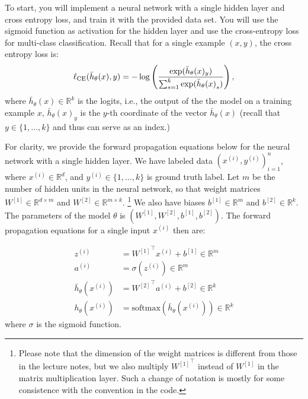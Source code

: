 To start, you will implement a neural network with a single hidden layer
and cross entropy loss, and train it with the provided data set. You will use the
sigmoid function as activation for the hidden layer and use the cross-entropy loss for multi-class classification. Recall that for a single example $(x, y)$, the cross
entropy loss is:
$$\ell_\textup{CE}(\bar{h}_{\theta}(x),y) = - \log\left(\frac{\exp(\bar{h}_{\theta}(x)_{y})}{\sum_{s=1}^{k}\exp({\bar{h}_{\theta}(x)}_s)}\right),$$
where $\bar{h}_{\theta}(x) \in \mathbb{R}^{k}$ is the logits, i.e., the output of the the model on a training example $x$, $\bar{h}_\theta(x)_y$ is the $y$-th coordinate of the vector $\bar{h}_\theta(x)$ (recall that $y\in \{1,\dots, k\}$ and thus can serve as an index.) 



For clarity, we provide the forward propagation equations below for the neural network with a single hidden layer. We have labeled data $(x^{(i)}, y^{(i)})_{i=1}^n$, where $x^{(i)} \in \mathbb{R}^d$, and $y^{(i)} \in \{1,\dots, k\}$ is ground truth label. Let $m$ be the number of hidden units in the neural network, so that weight matrices $W^{[1]} \in \mathbb{R}^{d \times m}$ and $W^{[2]} \in \mathbb{R}^{m \times k}$.
\footnote{Please note that the dimension of the weight matrices is different from those in the lecture notes, but we also multiply ${W^{[1]}}^\top$ instead of $W^{[1]}$ in the matrix multiplication layer.  Such a change of notation is mostly for some consistence with the convention in the code.}  
We also have biases $b^{[1]} \in \mathbb{R}^m$ and $b^{[2]} \in \mathbb{R}^k$. The parameters of the model $\theta$ is $(W^{[1]},W^{[2]},b^{[1]},b^{[2]})$. The forward propagation equations for a single input $x^{(i)}$ then are:

\begin{align*}
  z^{(i)} &= {W^{[1]}}^\top x^{(i)}  + b^{[1]} \in \mathbb{R}^m \\
  a^{(i)} &= \sigma \left( z^{(i)} \right)  \in \mathbb{R}^m \\
  \bar{h}_{\theta}(x^{(i)})&= {W^{[2]}}^\top a^{(i)} + b^{[2]} \in \mathbb{R}^k \\
  {h}_{\theta}(x^{(i)}) &=  \mathrm{softmax}(\bar{h}_{\theta}(x^{(i)})) \in \mathbb{R}^k
\end{align*}
where $\sigma$ is the sigmoid function. 


